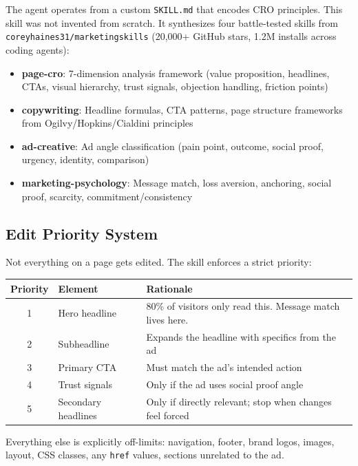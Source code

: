 \documentclass{article}
\begin{document}
The agent operates from a custom \texttt{SKILL.md} that encodes CRO principles. This skill was not invented from scratch. It synthesizes four battle-tested skills from \texttt{coreyhaines31/marketingskills} (20,000+ GitHub stars, 1.2M installs across coding agents):

\begin{itemize}[leftmargin=2em]
    \item \textbf{page-cro}: 7-dimension analysis framework (value proposition, headlines, CTAs, visual hierarchy, trust signals, objection handling, friction points)
    \item \textbf{copywriting}: Headline formulas, CTA patterns, page structure frameworks from Ogilvy/Hopkins/Cialdini principles
    \item \textbf{ad-creative}: Ad angle classification (pain point, outcome, social proof, urgency, identity, comparison)
    \item \textbf{marketing-psychology}: Message match, loss aversion, anchoring, social proof, scarcity, commitment/consistency
\end{itemize}

\subsection{Edit Priority System}

Not everything on a page gets edited. The skill enforces a strict priority:

\begin{center}
\begin{tabular}{clp{7cm}}
\toprule
\textbf{Priority} & \textbf{Element} & \textbf{Rationale} \\
\midrule
1 & Hero headline & 80\% of visitors only read this. Message match lives here. \\
2 & Subheadline & Expands the headline with specifics from the ad \\
3 & Primary CTA & Must match the ad's intended action \\
4 & Trust signals & Only if the ad uses social proof angle \\
5 & Secondary headlines & Only if directly relevant; stop when changes feel forced \\
\bottomrule
\end{tabular}
\end{center}

Everything else is explicitly off-limits: navigation, footer, brand logos, images, layout, CSS classes, any \texttt{href} values, sections unrelated to the ad.
\end{document}
